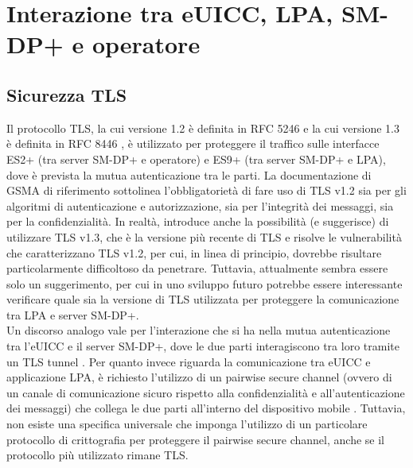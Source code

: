 \documentclass[10pt, oneside]{book}
\begin{document}
\section{Interazione tra eUICC, LPA, SM-DP+ e operatore}
\subsection{Sicurezza TLS}
Il protocollo TLS, la cui versione 1.2 è definita in RFC 5246 \cite{RFC-5246} e la cui versione 1.3 è definita in RFC 8446 \cite{RFC-8446}, è utilizzato per proteggere il traffico sulle interfacce ES2+ (tra server SM-DP+ e operatore) e ES9+ (tra server SM-DP+ e LPA), dove è prevista la mutua autenticazione tra le parti. La documentazione di GSMA di riferimento \cite{GSMA-docs-new} sottolinea l'obbligatorietà di fare uso di TLS v1.2 sia per gli algoritmi di autenticazione e autorizzazione, sia per l'integrità dei messaggi, sia per la confidenzialità. In realtà, introduce anche la possibilità (e suggerisce) di utilizzare TLS v1.3, che è la versione più recente di TLS e risolve le vulnerabilità che caratterizzano TLS v1.2, per cui, in linea di principio, dovrebbe risultare particolarmente difficoltoso da penetrare. Tuttavia, attualmente sembra essere solo un suggerimento, per cui in uno sviluppo futuro potrebbe essere interessante verificare quale sia la versione di TLS utilizzata per proteggere la comunicazione tra LPA e server SM-DP+.\\
Un discorso analogo vale per l'interazione che si ha nella mutua autenticazione tra l'eUICC e il server SM-DP+, dove le due parti interagiscono tra loro tramite un TLS tunnel \cite{Sec-analysis}. Per quanto invece riguarda la comunicazione tra eUICC e applicazione LPA, è richiesto l'utilizzo di un pairwise secure channel (ovvero di un canale di comunicazione sicuro rispetto alla confidenzialità e all'autenticazione dei messaggi) che collega le due parti all'interno del dispositivo mobile \cite{Sec-analysis}. Tuttavia, non esiste una specifica universale che imponga l'utilizzo di un particolare protocollo di crittografia per proteggere il pairwise secure channel, anche se il protocollo più utilizzato rimane TLS.
\end{document}
